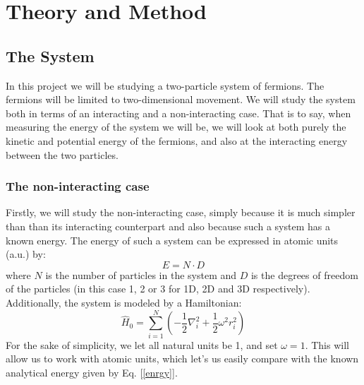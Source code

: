 \documentclass{article}
\begin{document}
\section{Theory and Method}
\subsection{The System}
In this project we will be studying a two-particle system of fermions. The fermions will be limited to two-dimensional movement. We will study the system both in terms of an interacting and a non-interacting case. That is to say, when measuring the energy of the system we will be, we will look at both purely the kinetic and potential energy of the fermions, and also at the interacting energy between the two particles.
\subsubsection{The non-interacting case}
Firstly, we will study the non-interacting case, simply because it is much simpler than than its interacting counterpart and also because such a system has a known energy. The energy of such a system can be expressed in atomic units (a.u.) by:
\begin{equation} \label{enrgy}
    E = N \cdot D
\end{equation}
where $N$ is the number of particles in the system and $D$ is the degrees of freedom of the particles (in this case 1, 2 or 3 for 1D, 2D and 3D respectively). Additionally, the system is modeled by a Hamiltonian:
\begin{equation}
    \hat H_0 = \sum_{i=1}^N \left( - \frac{1}{2}\nabla_i^2 + \frac{1}{2}\omega^2 r_i^2 \right)
\end{equation}
For the sake of simplicity, we let all natural units be 1, and set $\omega=1$. This will allow us to work with atomic units, which let's us easily compare with the known analytical energy given by Eq. [\ref{enrgy}]. 
\end{document}
